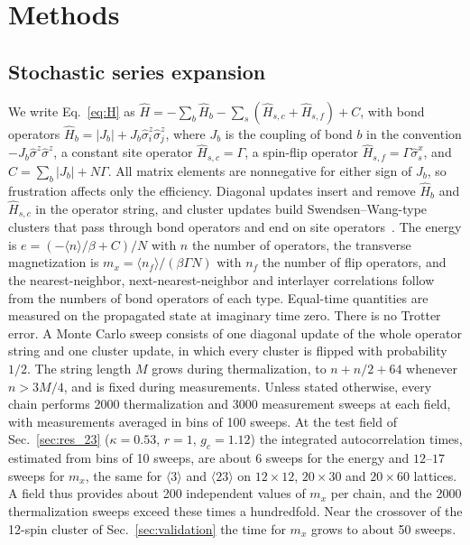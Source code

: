 \documentclass[
 aps,prb,
 twocolumn,
 superscriptaddress,
 longbibliography,
 nofootinbib,
 floatfix
]{revtex4-2}
\begin{document}
\section{Methods}
\label{sec:methods}

\subsection{Stochastic series expansion}

We write Eq.~\eqref{eq:H} as
$\hat H=-\sum_b\hat H_b-\sum_s(\hat H_{s,c}+\hat H_{s,f})+C$, with bond operators
$\hat H_b=|J_b|+J_b\hat\sigma^z_i\hat\sigma^z_j$, where $J_b$ is the coupling of bond $b$ in the
convention $-J_b\hat\sigma^z\hat\sigma^z$, a constant site operator $\hat H_{s,c}=\Gamma$, a spin-flip
operator $\hat H_{s,f}=\Gamma\hat\sigma^x_s$, and $C=\sum_b|J_b|+N\Gamma$. All matrix elements are
nonnegative for either sign of $J_b$, so frustration affects only the efficiency. Diagonal updates
insert and remove $\hat H_b$ and $\hat H_{s,c}$ in the operator string, and cluster updates
build Swendsen--Wang-type clusters that pass through bond operators and end on site
operators~\cite{sandvik2003stochastic}. The energy is $e=(-\langle n\rangle/\beta+C)/N$ with $n$ the
number of operators, the transverse magnetization is
$m_x=\langle n_f\rangle/(\beta\Gamma N)$ with $n_f$ the number of flip operators, and the
nearest-neighbor, next-nearest-neighbor and interlayer correlations follow from the numbers of
bond operators of each type. Equal-time quantities are measured on the propagated state at
imaginary time zero. There is no Trotter error. A Monte Carlo sweep consists of one diagonal update of the
whole operator string and one cluster update, in which every cluster is flipped with probability $1/2$. The
string length $M$ grows during thermalization, to $n+n/2+64$ whenever $n>3M/4$, and is fixed during
measurements. Unless stated otherwise, every chain performs 2000 thermalization and 3000 measurement sweeps
at each field, with measurements averaged in bins of 100 sweeps. At the test field of Sec.~\ref{sec:res_23}
($\kappa=0.53$, $r=1$, $g_c=1.12$) the integrated autocorrelation times, estimated from bins of 10 sweeps, are about 6
sweeps for the energy and $12$--$17$ sweeps for $m_x$, the same for $\langle3\rangle$ and $\langle23\rangle$ on
$12\times12$, $20\times30$ and $20\times60$ lattices. A field thus provides about 200 independent values of $m_x$ per
chain, and the 2000 thermalization sweeps exceed these times a hundredfold. Near the crossover of the 12-spin cluster
of Sec.~\ref{sec:validation} the time for $m_x$ grows to about 50 sweeps.
\end{document}
